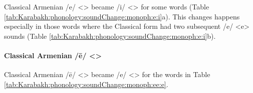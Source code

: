 Classical Armenian /e/ <> became /i/ <> for some words (Table \ref{tab:Karabakh:phonology:soundChange:monoph:e:i}a). This changes happens especially in those words where the Classical form had two   subsequent /e/ <e> sounds (Table \ref{tab:Karabakh:phonology:soundChange:monoph:e:i}b). 



\begin{table}[H]
	\centering
	\caption{Change from Classical Armenian /e/ <> to /i/ <> or in the Karabakh dialect}
	\label{tab:Karabakh:phonology:soundChange:monoph:e:i}
\end{table}

\paragraph{Classical Armenian /ē/ <>} 

Classical Armenian /ē/ <> became /e/ <> for the words in Table \ref{tab:Karabakh:phonology:soundChange:monoph:ee:e}. 


